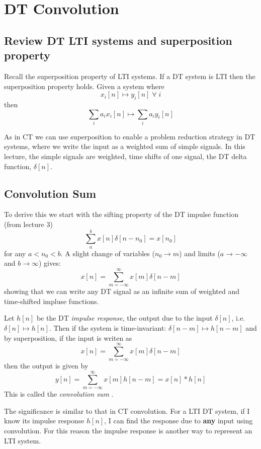 \chapter{DT Convolution}

\section{Review DT LTI systems and superposition property}

Recall the superposition property of LTI systems. If a DT system is LTI then the superposition property holds. Given a system where
\[   
x_i[n] \mapsto y_i[n] \; \forall\; i
\]
then
\[
\sum\limits_{i} a_i x_i[n] \mapsto \sum\limits_{i} a_i y_i[n] 
\]

As in CT we can use superposition to enable a problem reduction strategy in DT systems, where we write the input as a weighted sum of simple signals.  In this lecture, the simple signals are weighted, time shifts of one signal, the DT delta function, $\delta[n]$.

\section{Convolution Sum}

To derive this we start with the sifting property of the DT impulse function (from lecture 3)
\[
\sum\limits_{a}^{b} x[n]\delta[n-n_0] = x[n_0]
\]
for any $a < n_0 < b$. A slight change of variables ($n_0 \rightarrow m$) and limits ($a \rightarrow -\infty$ and $b \rightarrow \infty$) gives:
\[
x[n] = \sum\limits_{m = -\infty}^{\infty} x[m]\delta[n-m]
\]
showing that we can write any DT signal as an infinite sum of weighted and time-shifted impluse functions.

Let $h[n]$ be the DT {\it impulse response}, the output due to the input $\delta[n]$, i.e. $\delta[n] \mapsto h[n]$. Then if the system is time-invariant: $\delta[n-m] \mapsto h[n-m]$ and by superposition, if the input is writen as
\[
x[n] = \sum\limits_{m = -\infty}^{\infty} x[m]\delta[n-m]
\]
then the output is given by
\[
y[n] = \sum\limits_{m = -\infty}^{\infty} x[m]h[n-m] = x[n] * h[n]
\]
This is called the \emph{convolution sum} .

The significance is similar to that in CT convolution. For a LTI DT system, if I know its impulse response $h[n]$, I can find the response due to \textbf{any} input using convolution. For this reason the impulse response is another way to represent an LTI system.

